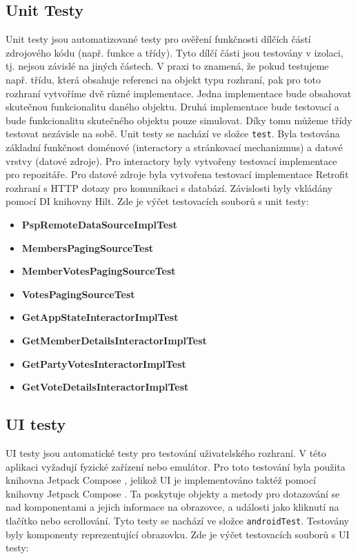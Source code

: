 \subsection{Unit Testy}
Unit testy jsou automatizované testy pro ověření funkčnosti dílčích částí zdrojového kódu (např. funkce a třídy). Tyto dílčí části jsou testovány v izolaci, tj. nejsou závislé na jiných částech. V praxi to znamená, že pokud testujeme např. třídu, která obsahuje referenci na objekt typu rozhraní, pak pro toto rozhraní vytvoříme dvě různé implementace. Jedna implementace bude obsahovat skutečnou funkcionalitu daného objektu. Druhá implementace bude testovací a bude funkcionalitu skutečného objektu pouze simulovat. Díky tomu můžeme třídy testovat nezávisle na sobě. Unit testy se nachází ve složce \texttt{test}. Byla testována základní funkčnost doménové (interactory a stránkovací mechanizmus) a datové vrstvy (datové zdroje). Pro interactory byly vytvořeny testovací implementace pro repozitáře. Pro datové zdroje byla vytvořena testovací implementace Retrofit rozhraní s HTTP dotazy pro komunikaci s databází. Závislosti byly vkládány pomocí DI knihovny Hilt. Zde je výčet testovacích souborů s unit testy:

\begin{itemize}
	\item \textbf{PspRemoteDataSourceImplTest}
	\item \textbf{MembersPagingSourceTest}
	\item \textbf{MemberVotesPagingSourceTest}
	\item \textbf{VotesPagingSourceTest}
	\item \textbf{GetAppStateInteractorImplTest}
	\item \textbf{GetMemberDetailsInteractorImplTest}
	\item \textbf{GetPartyVotesInteractorImplTest}
	\item \textbf{GetVoteDetailsInteractorImplTest}
\end{itemize}

\subsection{UI testy}
UI testy jsou automatické testy pro testování uživatelského rozhraní. V této aplikaci vyžadují fyzické zařízení nebo emulátor. Pro toto testování byla použita knihovna Jetpack Compose , jelikož UI je implementováno taktéž pomocí knihovny Jetpack Compose \cite{compose-test}. Ta poskytuje objekty a metody pro dotazování se nad komponentami a jejich informace na obrazovce, a události jako kliknutí na tlačítko nebo scrollování. Tyto testy se nachází ve složce \texttt{androidTest}. Testovány byly komponenty reprezentující obrazovku. Zde je výčet testovacích souborů s UI testy:

